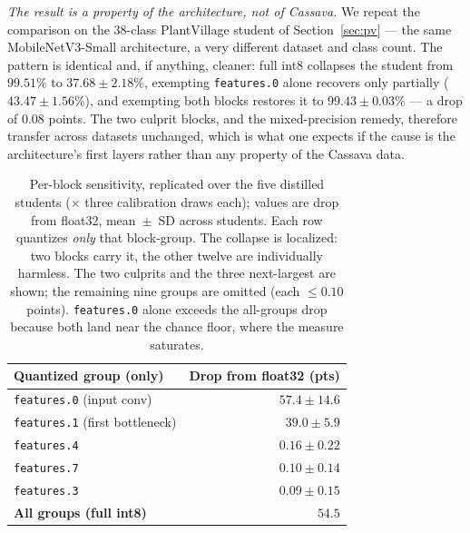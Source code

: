 \documentclass[conference]{IEEEtran}
\begin{document}
\emph{The result is a property of the architecture, not of Cassava.} We repeat the
comparison on the $38$-class PlantVillage student of Section~\ref{sec:pv} --- the
same MobileNetV3-Small architecture, a very different dataset and class count.
The pattern is identical and, if anything, cleaner: full int8 collapses the
student from $99.51\%$ to $37.68\pm2.18\%$, exempting \texttt{features.0} alone
recovers only partially ($43.47\pm1.56\%$), and exempting both blocks restores it
to $99.43\pm0.03\%$ --- a drop of $0.08$ points. The two culprit blocks, and the
mixed-precision remedy, therefore transfer across datasets unchanged, which is
what one expects if the cause is the architecture's first layers rather than any
property of the Cassava data.

\begin{table}
  \centering
  \caption{Per-block sensitivity, replicated over the five distilled students
  ($\times$ three calibration draws each); values are drop from float32,
  mean~$\pm$~SD across students. Each row quantizes \emph{only} that block-group.
  The collapse is localized: two blocks carry it, the other twelve are individually
  harmless. The two culprits and the three next-largest are shown; the remaining
  nine groups are omitted (each $\leq0.10$ points). \texttt{features.0} alone
  exceeds the all-groups drop because both land near the chance floor, where the
  measure saturates.}
  \label{tab:layer-sens}
  \begin{tabular}{lr}
    \toprule
    Quantized group (only) & Drop from float32 (pts) \\
    \midrule
    \texttt{features.0} (input conv)      & $\mathbf{57.4 \pm 14.6}$ \\
    \texttt{features.1} (first bottleneck) & $\mathbf{39.0 \pm 5.9}$ \\
    \texttt{features.4}                   & $0.16 \pm 0.22$ \\
    \texttt{features.7}                   & $0.10 \pm 0.14$ \\
    \texttt{features.3}                   & $0.09 \pm 0.15$ \\
    \midrule
    \textbf{All groups (full int8)}       & $\mathbf{54.5}$ \\
    \bottomrule
  \end{tabular}
\end{table}
\end{document}

